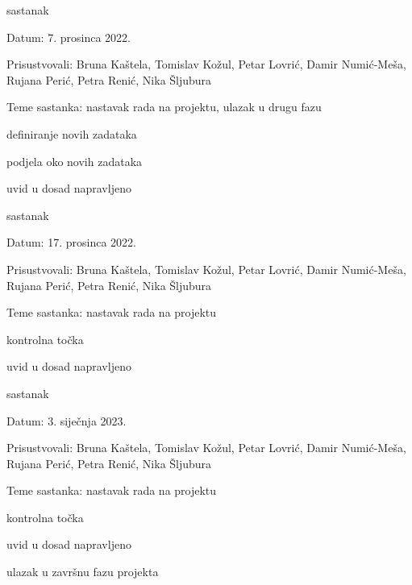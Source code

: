 \begin{packed_enum}
\begin{packed_item}
\begin{packed_item}
				\end{packed_item}
			\end{packed_item}

            \item  sastanak
			\item[] \begin{packed_item}
				\item Datum: 7. prosinca 2022. 
				\item Prisustvovali: Bruna Kaštela, Tomislav Kožul, Petar Lovrić, Damir Numić-Meša, Rujana Perić, Petra Renić, Nika Šljubura
				\item Teme sastanka: nastavak rada na projektu, ulazak u drugu fazu
				\begin{packed_item}
					\item  definiranje novih zadataka
					\item  podjela oko novih zadataka
                    \item  uvid u dosad napravljeno

				\end{packed_item}
			\end{packed_item}

            \item  sastanak
			\item[] \begin{packed_item}
				\item Datum: 17. prosinca 2022. 
				\item Prisustvovali: Bruna Kaštela, Tomislav Kožul, Petar Lovrić, Damir Numić-Meša, Rujana Perić, Petra Renić, Nika Šljubura
				\item Teme sastanka: nastavak rada na projektu
				\begin{packed_item}
					\item   kontrolna točka
                    \item  uvid u dosad napravljeno

				\end{packed_item}
			\end{packed_item}

            \item  sastanak
			\item[] \begin{packed_item}
				\item Datum: 3. siječnja 2023. 
				\item Prisustvovali: Bruna Kaštela, Tomislav Kožul, Petar Lovrić, Damir Numić-Meša, Rujana Perić, Petra Renić, Nika Šljubura
				\item Teme sastanka: nastavak rada na projektu
				\begin{packed_item}
					\item  kontrolna točka
                    \item  uvid u dosad napravljeno
                    \item  ulazak u završnu fazu projekta
				\end{packed_item}
			\end{packed_item}
			
		\end{packed_enum}
		
